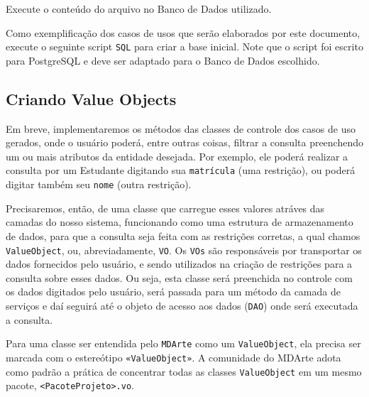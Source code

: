 Execute o conteúdo do arquivo no Banco de Dados utilizado.

Como exemplificação dos casos de usos que serão elaborados por este documento,
execute o seguinte script \texttt{SQL} para criar a base inicial. Note que o
script foi escrito para PostgreSQL e deve ser adaptado para o Banco de Dados
escolhido.

\begin{framed}
	
\end{framed}

\subsection{Criando Value Objects}

Em breve, implementaremos os métodos das classes de controle dos casos de uso
gerados, onde o usuário poderá, entre outras coisas, filtrar a consulta
preenchendo um ou mais atributos da entidade desejada. Por exemplo, ele poderá
realizar a consulta por um Estudante digitando sua \texttt{matrícula} (uma
restrição), ou poderá digitar também seu \texttt{nome} (outra restrição).

Precisaremos, então, de uma classe que carregue esses valores atráves das
camadas do nosso sistema, funcionando como uma estrutura de armazenamento de
dados, para que a consulta seja feita com as restrições corretas, a qual chamos
\texttt{ValueObject}, ou, abreviadamente, \texttt{VO}. Os \texttt{VOs} são
responsáveis por transportar os dados fornecidos pelo usuário, e sendo
utilizados na criação de restrições para a consulta sobre esses dados. Ou seja,
esta classe será preenchida no controle com os dados digitados pelo usuário,
será passada para um método da camada de serviços e daí seguirá até o objeto de
acesso aos dados (\texttt{DAO}) onde será executada a consulta.

Para uma classe ser entendida pelo \texttt{MDArte} como um \texttt{ValueObject},
ela precisa ser marcada com o estereótipo \texttt{«ValueObject»}. A comunidade
do MDArte adota como padrão a prática de concentrar todas as classes
\texttt{ValueObject} em um mesmo pacote, \texttt{<PacoteProjeto>.vo}.

